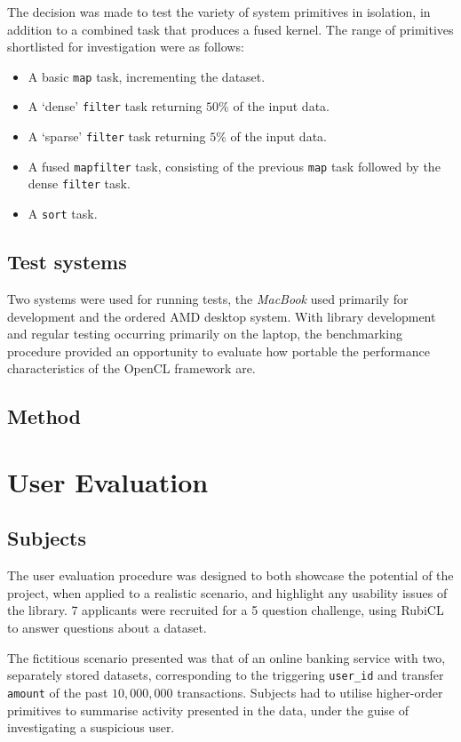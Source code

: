 The decision was made to test the variety of system primitives in isolation, in addition to a combined task that produces a fused kernel.
The range of primitives shortlisted for investigation were as follows:
\begin{itemize}
  \item A basic \verb|map| task, incrementing the dataset.
  \item A `dense' \verb|filter| task returning $50\%$ of the input data.
  \item A `sparse' \verb|filter| task returning $5\%$ of the input data.
  \item A fused \verb|mapfilter| task, consisting of the previous \verb|map| task followed by the dense \verb|filter| task.
  \item A \verb|sort| task.
\end{itemize}

\subsection{Test systems}
Two systems were used for running tests, the \emph{MacBook} used primarily for development and the ordered \ac{AMD} desktop system.
With library development and regular testing occurring primarily on the laptop, the benchmarking procedure provided an opportunity to evaluate how portable the performance characteristics of the \ac{OpenCL} framework are.


\subsection{Method}

\section{User Evaluation}
\subsection{Subjects}
The user evaluation procedure was designed to both showcase the potential of the project, when applied to a realistic scenario, and highlight any usability issues of the library.
7 applicants were recruited for a 5 question challenge, using RubiCL to answer questions about a dataset.

The fictitious scenario presented was that of an online banking service with two, separately stored datasets, corresponding to the triggering \verb|user_id| and transfer \verb|amount| of the past $10,000,000$ transactions. Subjects had to utilise higher-order primitives to summarise activity presented in the data, under the guise of investigating a suspicious user.

